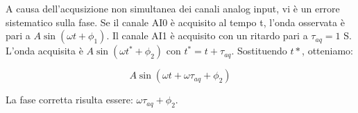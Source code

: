 \documentclass[../Relazione_circuiti]{subfiles}
\begin{document}
A causa dell'acqusizione non simultanea dei canali analog input, vi è un errore sistematico sulla fase.
Se il canale AI0 è acquisito al tempo t, l'onda osservata è pari a $A\sin(\omega t +\phi_1)$. Il canale AI1 è acquisito con un ritardo pari a $\tau_{aq} = 1$ \textmu S. L'onda acquisita è $A\sin(\omega t^* +\phi_2)$ con $t^*=t+\tau_{aq}$. Sostituendo $t*$, otteniamo:

\begin{equation}
A\sin(\omega t + \omega \tau_{aq} + \phi_2)
\end{equation}

La fase corretta risulta essere: $\omega \tau_{aq} + \phi_2$.
\end{document}
